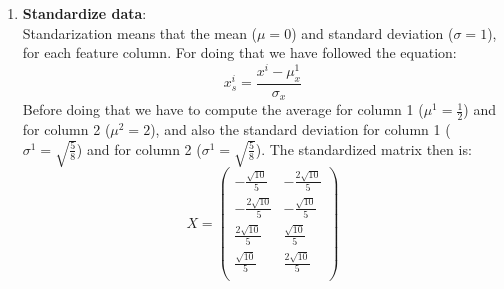 \documentclass[12pt]{article}
\begin{document}
\begin{enumerate}
    \item \textbf{Standardize data}: \\
    Standarization means that the mean ($\mu=0$) and standard deviation ($\sigma=1$), for each feature column. For doing that we have followed the equation:
    \begin{equation}
        x_s^i = \frac{x^i - \mu_x^1}{\sigma_x}
    \end{equation}
    Before doing that we have to compute the average for column 1 ($\mu^1=\frac{1}{2}$) and for column 2 ($\mu^2=2$), and also the standard deviation for column 1 ($\sigma^1 = \sqrt{\frac{5}{8}}$) and for column 2 ($\sigma^1 = \sqrt{\frac{5}{8}}$). The standardized matrix then is:
    \begin{equation}
    X =
        \begin{pmatrix}
         -\frac{\sqrt{10}}{5} & -\frac{2\sqrt{10}}{5} \\
         -\frac{2\sqrt{10}}{5} & -\frac{\sqrt{10}}{5} \\
         \frac{2\sqrt{10}}{5} & \frac{\sqrt{10}}{5} \\
         \frac{\sqrt{10}}{5} & \frac{2\sqrt{10}}{5} \\
        \end{pmatrix}
    \end{equation}
    

\end{enumerate}
\end{document}
